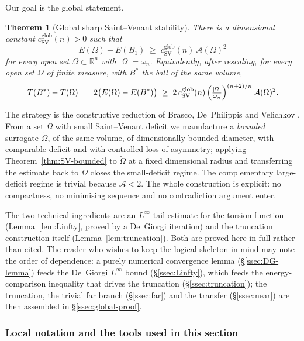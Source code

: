 \documentclass[11pt]{amsart}
\newtheorem{theorem}{Theorem}[section]
\theoremstyle{definition}
\newcommand{\R}{\mathbb R}
\newcommand{\Om}{\Omega}
\newcommand{\Fr}{\mathcal A}
\newcommand{\abs}[1]{\left|#1\right|}
\newcommand{\Otilde}{\widetilde{\Omega}}
\begin{document}
Our goal is the global statement.

\begin{theorem}[Global sharp Saint--Venant stability]\label{thm:SV-global}
There is a dimensional constant $c_{\mathrm{SV}}^{\mathrm{glob}}(n)>0$
such that
\begin{equation}\label{eq:SV-global}
   E(\Om)-E(B_1)\;\ge\;c_{\mathrm{SV}}^{\mathrm{glob}}(n)\,\Fr(\Om)^2
\end{equation}
for every open set $\Om\subset\R^n$ with $\abs{\Om}=\omega_n$.
Equivalently, after rescaling, for every open set $\Om$ of finite
measure, with $B^*$ the ball of the same volume,
\begin{equation}\label{eq:T-global}
   T(B^*)-T(\Om)\;=\;2\bigl(E(\Om)-E(B^*)\bigr)\;\ge\;
   2\,c_{\mathrm{SV}}^{\mathrm{glob}}(n)\,
   \Bigl(\tfrac{\abs{\Om}}{\omega_n}\Bigr)^{(n+2)/n}\,\Fr(\Om)^2 .
\end{equation}
\end{theorem}

The strategy is the constructive reduction of Brasco, De~Philippis and
Velichkov \cite[\S5]{BDV}. From a set $\Om$ with small Saint--Venant
deficit we manufacture a \emph{bounded} surrogate $\Otilde$, of the same
volume, of dimensionally bounded diameter, with comparable deficit and
with controlled loss of asymmetry; applying
Theorem~\ref{thm:SV-bounded} to $\Otilde$ at a fixed dimensional radius
and transferring the estimate back to $\Om$ closes the small-deficit
regime. The complementary large-deficit regime is trivial because
$\Fr<2$. The whole construction is explicit: no compactness, no
minimising sequence and no contradiction argument enter.

The two technical ingredients are an $L^\infty$ tail estimate for the
torsion function (Lemma~\ref{lem:Linfty}, proved by a De~Giorgi
iteration) and the truncation construction itself
(Lemma~\ref{lem:truncation}). Both are proved here in full rather than
cited. The reader who wishes to keep the logical skeleton in mind may
note the order of dependence: a purely numerical convergence lemma
(\S\ref{ssec:DG-lemma}) feeds the De~Giorgi $L^\infty$ bound
(\S\ref{ssec:Linfty}), which feeds the energy-comparison inequality that
drives the truncation (\S\ref{ssec:truncation}); the truncation, the
trivial far branch (\S\ref{ssec:far}) and the transfer
(\S\ref{ssec:near}) are then assembled in \S\ref{ssec:global-proof}.

\subsubsection{Local notation and the tools used in this section}
\label{ssec:notation}
\end{document}
